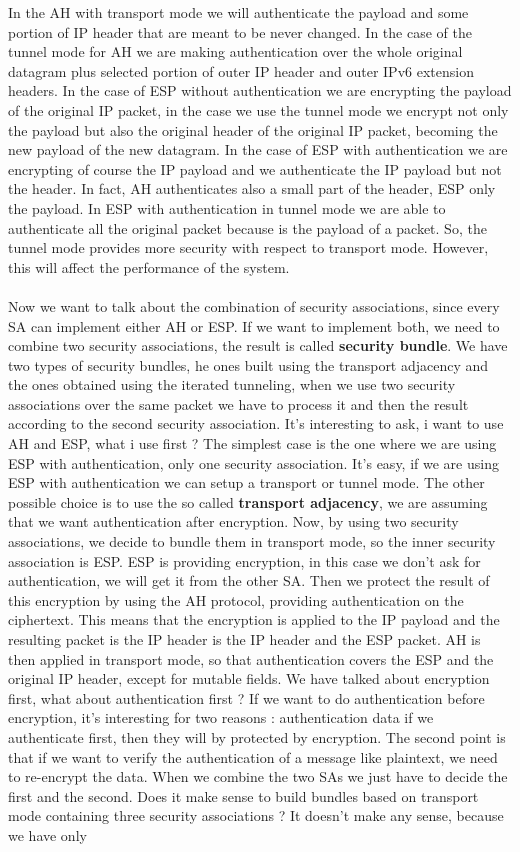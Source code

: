 \documentclass[11pt]{article}
\begin{document}
In the AH with transport mode we will authenticate the payload and some portion of IP header that are meant to be never changed. In the case of the tunnel mode for AH we are making authentication over the whole original datagram plus selected portion of outer IP header and outer IPv6 extension headers. In the case of ESP without authentication we are encrypting the payload of the original IP packet, in the case we use the tunnel mode we encrypt not only the payload but also the original header of the original IP packet, becoming the new payload of the new datagram. In the case of ESP with authentication we are encrypting of course the IP payload and we authenticate the IP payload but not the header. In fact, AH authenticates also a small part of the header, ESP only the payload. In ESP with authentication in tunnel mode we are able to authenticate all the original packet because is the payload of a packet. So, the tunnel mode provides more security with respect to transport mode. However, this will affect the performance of the system. \\\\Now we want to talk about the combination of security associations, since every SA can implement either AH or ESP. If we want to implement both, we need to combine two security associations, the result is called \textbf{security bundle}. We have two types of security bundles, he ones built using the transport adjacency and the ones obtained using the iterated tunneling, when we use two security associations over the same packet we have to process it and then the result according to the second security association. It's interesting to ask, i want to use AH and ESP, what i use first ? The simplest case is the one where we are using ESP with authentication, only one security association. It's easy, if we are using ESP with authentication we can setup a transport or tunnel mode. The other possible choice is to use the so called \textbf{transport adjacency}, we are assuming that we want authentication after encryption. Now, by using two security associations, we decide to bundle them in transport mode, so the inner security association is ESP. ESP is providing encryption, in this case we don't ask for authentication, we will get it from the other SA. Then we protect the result of this encryption by using the AH protocol, providing authentication on the ciphertext. This means that the encryption is applied to the IP payload and the resulting packet is the IP header is the IP header and the ESP packet. AH is then applied in transport mode, so that authentication covers the ESP and the original IP header, except for mutable fields. We have talked about encryption first, what about authentication first ? If we want to do authentication before encryption, it's interesting for two reasons : authentication data if we authenticate first, then they will by protected by encryption. The second point is that if we want to verify the authentication of a message like plaintext, we need to re-encrypt the data. When we combine the two SAs we just have to decide the first and the second. Does it make sense to build bundles based on transport mode containing three security associations ? It doesn't make any sense, because we have only 
\end{document}
